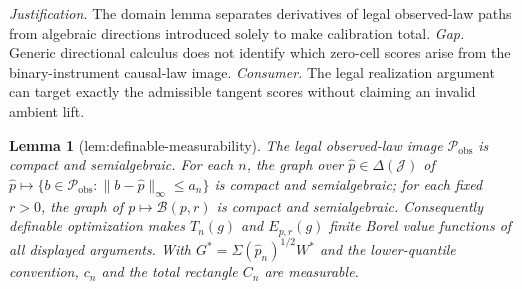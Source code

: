 \documentclass{article}
\newtheorem{lemma}{Lemma}
\begin{document}
\par\smallskip\noindent \textit{Justification.} The domain lemma separates derivatives of legal observed-law paths from algebraic directions introduced solely to make calibration total. \textit{Gap.} Generic directional calculus does not identify which zero-cell scores arise from the binary-instrument causal-law image. \textit{Consumer.} The legal realization argument can target exactly the admissible tangent scores without claiming an invalid ambient lift.

\begin{lemma}[lem:definable-measurability]\label{lem:definable-measurability}
The legal observed-law image \(\mathcal P_{\mathrm{obs}}\) is compact and semialgebraic. For each \(n\), the graph over \(\widehat p\in\Delta(\mathcal J)\) of \(\widehat p\mapsto\{b\in\mathcal P_{\mathrm{obs}}:\|b-\widehat p\|_\infty\le a_n\}\) is compact and semialgebraic; for each fixed \(r>0\), the graph of \(p\mapsto\mathcal B(p,r)\) is compact and semialgebraic. Consequently definable optimization makes \(T_n(g)\) and \(E_{p,r}(g)\) finite Borel value functions of all displayed arguments. With \(G^*=\Sigma(\widehat p_n)^{1/2}W^*\) and the lower-quantile convention, \(c_n\) and the total rectangle \(C_n\) are measurable.
\end{lemma}
\end{document}
